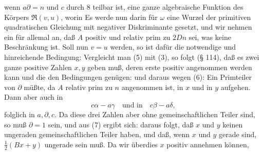 wenn $a\partial = n$ und $c$ durch 8 teilbar ist, eine ganze algebraische
Funktion des Körpers $\mathfrak{R}(v,u)$, worin
Es werde nun darin für $\omega$ eine Wurzel der primitiven
quadratischen Gleichung
mit negativer Diskriminante
gesetzt, und wir nehmen ein für allemal an, daß $A$ positiv und
relativ prim zu $2Dn$ sei, was keine Beschränkung ist. Soll nun
$v = u$ werden, so ist dafür die notwendige und hinreichende
Bedingung:
Vergleicht man (5) mit (3), so folgt (§ 114), daß es zwei
ganze positive Zahlen $x, y$ geben muß, deren erste positiv angenommen werden kann und die den Bedingungen genügen:
und daraus wegen (6):
Ein Primteiler von $\partial$ müßte, da $A$ relativ prim zu $n$ angenommen ist, in $x$ und in $y$ aufgehen. Dann aber auch in
\[
c\alpha - a\gamma \quad\text{und in}\quad c\beta - a\delta,
\]
folglich in $a, \partial, c$. Da diese drei Zahlen aber ohne gemeinschaftlichen Teiler sind, so muß $\partial = 1$ sein, und aus (7) ergibt sich:
daraus folgt, daß $x$ und $y$ keinen ungeraden gemeinschaftlichen Teiler haben, und daß, wenn $x$ und $y$ gerade sind, $\frac{1}{2}(Bx+y)$ ungerade sein muß. Da wir überdies $x$ positiv annehmen können,
